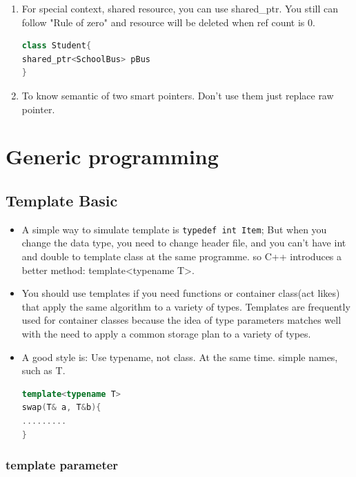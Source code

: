\documentclass[a4paper,12pt,twoside]{book}
\begin{document}
\begin{itemize}
\begin{enumerate}
\item For special context, shared resource, you can use shared\_ptr.  You still can follow "Rule of zero" and resource will be deleted when ref count is 0.
\begin{lstlisting}[frame=single, language=c++]
class Student{
shared_ptr<SchoolBus> pBus
}
\end{lstlisting}

\item To know semantic of two smart pointers. Don't use them just replace raw pointer.
\end{enumerate}

\end{itemize}

\section{Generic programming}


\subsection{Template Basic}
\begin{itemize}
\item A simple way to simulate template is \verb=typedef int Item=; But when you change the data type, you need to change header file, and you can't have int and double to template class at the same programme. so C++ introduces a better method: template<typename T>.

\item You should use templates if you need functions or container class(act likes) that apply the same algorithm to a variety of types. Templates are frequently used for container classes because the idea of type parameters matches well with the need to apply a common storage plan to a variety of types.

\item A good style is: Use typename, not class. At the same time. simple names, such as T.
\begin{lstlisting}[frame=single, language=c++]
template<typename T> 
swap(T& a, T&b){
.........
}
\end{lstlisting}

\end{itemize}

\subsubsection{template parameter}
\end{document}
